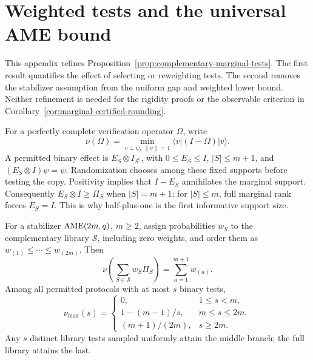 \section{Weighted tests and the universal AME bound}
\label{app:marginal-verification}

This appendix refines Proposition~\ref{prop:complementary-marginal-tests}.
The first result quantifies the effect of selecting or reweighting tests.
The second removes the stabilizer assumption from the uniform gap and
weighted lower bound.  Neither refinement is needed for the rigidity
proofs or the observable criterion in
Corollary~\ref{cor:marginal-certified-rounding}.

For a perfectly complete verification operator \(\Omega\), write
\[
 \nu(\Omega)=\min_{v\perp\psi,\ \|v\|=1}
                  \langle v|(I-\Omega)|v\rangle.
\]
A permitted binary effect is \(E_S\otimes I_{S^c}\), with
\(0\leq E_S\leq I\), \(|S|\leq m+1\), and
\((E_S\otimes I)\psi=\psi\).  Randomization chooses among these fixed
supports before testing the copy.  Positivity implies that \(I-E_S\)
annihilates the marginal support.  Consequently \(E_S\otimes I\geq\Pi_S\)
when \(|S|=m+1\); for \(|S|\leq m\), full marginal rank forces
\(E_S=I\).  This is why half-plus-one is the first informative support size.

\begin{proposition}
\label{prop:weighted-marginal-tests}
For a stabilizer \(\mathrm{AME}(2m,q)\), \(m\geq2\), assign probabilities
\(w_S\) to the complementary library \(\mathcal S\), including zero
weights, and order them as \(w_{(1)}\leq\cdots\leq w_{(2m)}\).  Then
\begin{equation}
 \nu\!\left(\sum_{S\in\mathcal S}w_S\Pi_S\right)
       =\sum_{a=1}^{m+1}w_{(a)}.
 \label{eq:weighted-marginal-gap}
\end{equation}
Among all permitted protocols with at most \(s\) binary tests,
\begin{equation}
 \nu_{\max}(s)=
 \begin{cases}
 0,&1\leq s<m,\\
 1-(m-1)/s,&m\leq s\leq2m,\\
 (m+1)/(2m),&s\geq2m.
 \end{cases}
 \label{eq:marginal-test-tradeoff}
\end{equation}
Any \(s\) distinct library tests sampled uniformly attain the middle
branch; the full library attains the last.
\end{proposition}

